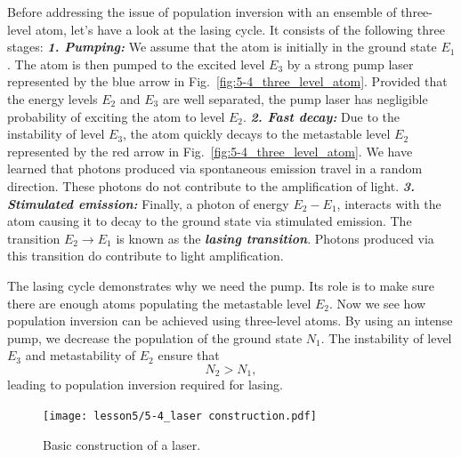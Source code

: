 Before addressing the issue of population inversion with an ensemble of three-level atom, let's have a look at the lasing cycle.
It consists of the following three stages:
\newline
\textit{\textbf{1. Pumping:}}
We assume that the atom is initially in the ground state $E_1$.
The atom is then pumped to the excited level $E_3$ by a strong pump laser represented by the blue arrow in Fig.~\ref{fig:5-4_three_level_atom}.
Provided that the energy levels $E_2$ and $E_3$ are well separated, the pump laser has negligible probability of exciting the atom to level $E_2$.
\newline
\textit{\textbf{2. Fast decay:}}
Due to the instability of level $E_3$, the atom quickly decays to the metastable level $E_2$ represented by the red arrow in Fig.~\ref{fig:5-4_three_level_atom}.
We have learned that photons produced via spontaneous emission travel in a random direction.
These photons do not contribute to the amplification of light.
\newline
\textit{\textbf{3. Stimulated emission:}}
Finally, a photon of energy $E_2-E_1$, interacts with the atom causing it to decay to the ground state via stimulated emission.
The transition $E_2\rightarrow E_1$ is known as the \textbf{\emph{lasing transition}}.
Photons produced via this transition do contribute to light amplification.

The lasing cycle demonstrates why we need the pump.
Its role is to make sure there are enough atoms populating the metastable level $E_2$.
Now we see how population inversion can be achieved using three-level atoms.
By using an intense pump, we decrease the population of the ground state $N_1$.
The instability of level $E_3$ and metastability of $E_2$ ensure that
\begin{equation}
    N_2 > N_1,
\end{equation}
leading to population inversion required for lasing.

\begin{figure}[t]
    \centering
    \texttt{[image: lesson5/5-4\_laser construction.pdf]}
    \caption[Laser construction]{Basic construction of a laser.}
    \label{fig:5-4_laser_construction}
\end{figure}

